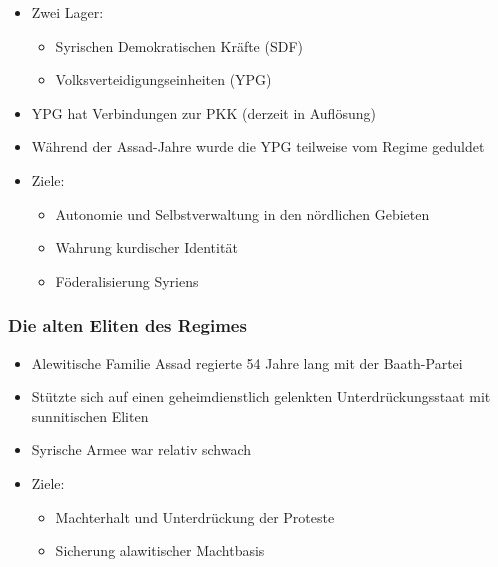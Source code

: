 {}\documentclass[a4paper]{article}
\providecommand{\tightlist}{\setlength{\itemsep}{1mm}\setlength{\parskip}{1mm}}
\begin{document}
\begin{itemize}
	\tightlist
	\item
	      Zwei Lager:

	      \begin{itemize}
		      \tightlist
		      \item
		            Syrischen Demokratischen Kräfte (SDF)
		      \item
		            Volksverteidigungseinheiten (YPG)
	      \end{itemize}
	\item
	      YPG hat Verbindungen zur PKK (derzeit in Auflösung)
	\item
	      Während der Assad-Jahre wurde die YPG teilweise vom Regime geduldet
	\item
	      Ziele:

	      \begin{itemize}
		      \tightlist
		      \item
		            Autonomie und Selbstverwaltung in den nördlichen Gebieten
		      \item
		            Wahrung kurdischer Identität
		      \item
		            Föderalisierung Syriens
	      \end{itemize}
\end{itemize}

\subsubsection{Die alten Eliten des
	Regimes}\label{die-alten-eliten-des-regimes}

\begin{itemize}
	\tightlist
	\item
	      Alewitische Familie Assad regierte 54 Jahre lang mit der Baath-Partei
	\item
	      Stützte sich auf einen geheimdienstlich gelenkten Unterdrückungsstaat
	      mit sunnitischen Eliten
	\item
	      Syrische Armee war relativ schwach
	\item
	      Ziele:

	      \begin{itemize}
		      \tightlist
		      \item
		            Machterhalt und Unterdrückung der Proteste
		      \item
		            Sicherung alawitischer Machtbasis
	      \end{itemize}
\end{itemize}
\end{document}
